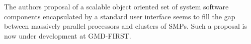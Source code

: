 	The authors proposal of a scalable object oriented set of system software components encapsulated by a standard user interface seems to fill the gap between massively parallel processors and clusters of SMPs. Such a proposal is now under development at GMD-FIRST.







